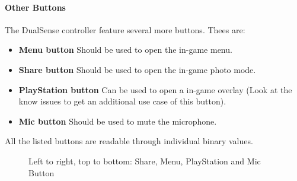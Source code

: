 \paragraph{Other Buttons}
The DualSense controller feature several more buttons. Thees are:
\begin{itemize}
	\item \textbf{Menu button} Should be used to open the in-game menu.
	\item \textbf{Share button} Should be used to open the in-game photo mode.
	\item \textbf{PlayStation button} Can be used to open a in-game overlay (Look at the know issues to get an additional use case of this button).
	\item \textbf{Mic button} Should be used to mute the microphone.
\end{itemize}
All the listed buttons are readable through individual binary values.
\begin{figure}[H]
    \centering
    \caption{Left to right, top to bottom: Share, Menu, PlayStation and Mic Button}
\end{figure}

